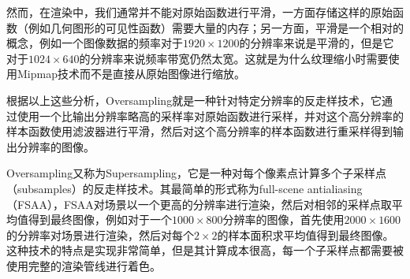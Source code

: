 然而，在渲染中，我们通常并不能对原始函数进行平滑，一方面存储这样的原始函数（例如几何图形的可见性函数）需要大量的内存；另一方面，平滑是一个相对的概念，例如一个图像数据的频率对于$1920\times 1200$的分辨率来说是平滑的，但是它对于$1024\times 640$的分辨率来说频率带宽仍然太宽。这就是为什么纹理缩小时需要使用Mipmap技术而不是直接从原始图像进行缩放。

根据以上这些分析，Oversampling就是一种针对特定分辨率的反走样技术，它通过使用一个比输出分辨率略高的采样率对原始函数进行采样，并对这个高分辨率的样本函数使用滤波器进行平滑，然后对这个高分辨率的样本函数进行重采样得到输出分辨率的图像。

Oversampling又称为Supersampling，它是一种对每个像素点计算多个子采样点（subsamples）的反走样技术。其最简单的形式称为full-scene antialiasing（FSAA），FSAA对场景以一个更高的分辨率进行渲染，然后对相邻的采样点取平均值得到最终图像，例如对于一个$1000\times 800$分辨率的图像，首先使用$2000\times 1600$的分辨率对场景进行渲染，然后对每个$2\times 2$的样本面积求平均值得到最终图像。这种技术的特点是实现非常简单，但是其计算成本很高，每一个子采样点都需要被使用完整的渲染管线进行着色。

